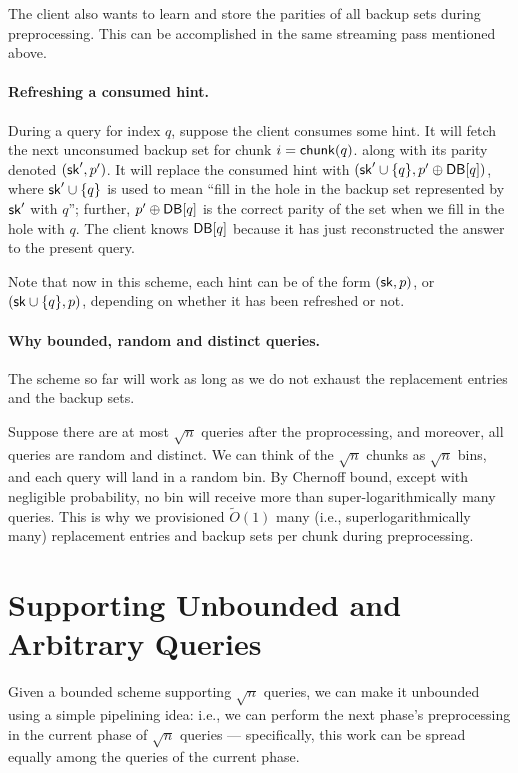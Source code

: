The client also wants to learn and store the parities of all backup sets
during preprocessing.
This can be accomplished in the same streaming pass 
mentioned above.


\paragraph{Refreshing a consumed hint.}
During a query for index $q$, 
suppose the client consumes some hint. %
It will fetch
the next unconsumed backup set 
for chunk $i = {\sf chunk}(q)$.
along with its parity denoted $({\sf sk}', p')$.
It will replace the consumed hint with $({\sf sk}' \cup \{q\}, p' \oplus {\sf DB}[q])$,
where ${\sf sk}' \cup \{q\}$ is used to mean ``fill in the hole in the backup set represented
by ${\sf sk}'$ with $q$''; further, 
$p' \oplus {\sf DB}[q]$ is the correct parity of the set when we fill in the hole with $q$.
The client knows ${\sf DB}[q]$ because it has just reconstructed the answer to the present query.

Note that now in this scheme, 
each hint can be of the form $({\sf sk}, p)$, or $({\sf sk} \cup \{q\}, p)$, depending on whether
it has been refreshed or not.


\paragraph{Why bounded, random and distinct
queries.}
The scheme so far will work as long as we do not exhaust
the replacement entries and the backup sets.

Suppose there are at most $\sqrt{n}$ queries after the proprocessing,
and moreover, all queries are random and distinct.
We can think of the $\sqrt{n}$ chunks
as $\sqrt{n}$ bins, and 
each query will land in a random bin.
By Chernoff bound,  
except with negligible probability, 
no bin will receive more than super-logarithmically many queries.
This is why we provisioned $\widetilde{O}(1)$ many (i.e., superlogarithmically many)
replacement entries and backup sets 
per chunk during preprocessing. 

\section{Supporting Unbounded and Arbitrary Queries}

Given a bounded scheme supporting $\sqrt{n}$ queries, we can make it unbounded
using a simple pipelining idea: i.e., 
we can perform 
the next phase's preprocessing in the current phase of $\sqrt{n}$ queries --- specifically,
this work can be spread equally among the queries of the current phase.

